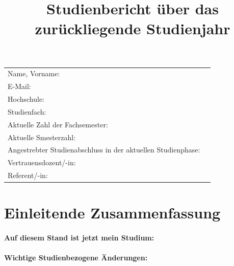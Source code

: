 \documentclass[]{scrartcl}
\title{Studienbericht über das zurückliegende Studienjahr}
\date{}
\begin{document}
\maketitle

\begin{tabular}{ll}
    Name, Vorname: & \\
    E-Mail: & \texttt{} \\
    Hochschule: & \\
    Studienfach: & \\
    Aktuelle Zahl der Fachsemester: & \\
    Aktuelle Smesterzahl: & \\ %
    Angestrebter Studienabschluss in der aktuellen Studienphase: & \\ %
    Vertrauensdozent/-in: & \\
    Referent/-in: & \\
\end{tabular}


\section*{Einleitende Zusammenfassung}

\paragraph{Auf diesem Stand ist jetzt mein Studium:}

\paragraph{Wichtige Studienbezogene Änderungen:}
%
\end{document}
